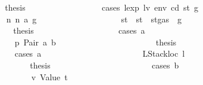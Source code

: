 \begin{isabellebody}
\ \ \ \ \ \ \ \ \ \ \ \ \ \ \ \ \isamarkupfalse%
\ \isamarkupfalse%
\ {\isacharquery}{\kern0pt}thesis\isanewline
\ \ \ \ \ \ \ \ \ \ \ \ \ \ \ \ \isamarkupfalse%
\ {\isacharparenleft}{\kern0pt}cases\ {\isachardoublequoteopen}lexp\ lv\ env\ cd\ st{\isacharprime}{\kern0pt}{\isacharprime}{\kern0pt}\ g{\isacharprime}{\kern0pt}{\isachardoublequoteclose}{\isacharparenright}{\kern0pt}\isanewline
\ \ \ \ \ \ \ \ \ \ \ \ \ \ \ \ \ \ \isamarkupfalse%
\ n{}{\isacharcolon}{\kern0pt}\ {\isacharparenleft}{\kern0pt}n\ a\ g{\isacharprime}{\kern0pt}{\isacharprime}{\kern0pt}{\isacharparenright}{\kern0pt}\isanewline
\ \ \ \ \ \ \ \ \ \ \ \ \ \ \ \ \ \ \isamarkupfalse%
\ st{\isacharprime}{\kern0pt}{\isacharprime}{\kern0pt}{\isacharprime}{\kern0pt}\ \ {\isachardoublequoteopen}st{\isacharprime}{\kern0pt}{\isacharprime}{\kern0pt}{\isacharprime}{\kern0pt}\ {\isacharequal}{\kern0pt}\ st{\isacharprime}{\kern0pt}{\isacharprime}{\kern0pt}{\isasymlparr}gas\ {\isacharcolon}{\kern0pt}{\isacharequal}{\kern0pt}\ g{\isacharprime}{\kern0pt}{\isacharprime}{\kern0pt}{\isasymrparr}{\isachardoublequoteclose}\isanewline
\ \ \ \ \ \ \ \ \ \ \ \ \ \ \ \ \ \ \isamarkupfalse%
\ \isamarkupfalse%
\ {\isacharquery}{\kern0pt}thesis\isanewline
\ \ \ \ \ \ \ \ \ \ \ \ \ \ \ \ \ \ \isamarkupfalse%
\ {\isacharparenleft}{\kern0pt}cases\ a{\isacharparenright}{\kern0pt}\isanewline
\ \ \ \ \ \ \ \ \ \ \ \ \ \ \ \ \ \ \ \ \isamarkupfalse%
\ p{}{\isacharcolon}{\kern0pt}\ {\isacharparenleft}{\kern0pt}Pair\ a\ b{\isacharparenright}{\kern0pt}\isanewline
\ \ \ \ \ \ \ \ \ \ \ \ \ \ \ \ \ \ \ \ \isamarkupfalse%
\ \isamarkupfalse%
\ {\isacharquery}{\kern0pt}thesis\isanewline
\ \ \ \ \ \ \ \ \ \ \ \ \ \ \ \ \ \ \ \ \isamarkupfalse%
\ {\isacharparenleft}{\kern0pt}cases\ a{\isacharparenright}{\kern0pt}\isanewline
\ \ \ \ \ \ \ \ \ \ \ \ \ \ \ \ \ \ \ \ \ \ \isamarkupfalse%
\ {\isacharparenleft}{\kern0pt}LStackloc\ l{\isacharparenright}{\kern0pt}\isanewline
\ \ \ \ \ \ \ \ \ \ \ \ \ \ \ \ \ \ \ \ \ \ \isamarkupfalse%
\ \isamarkupfalse%
\ {\isacharquery}{\kern0pt}thesis\isanewline
\ \ \ \ \ \ \ \ \ \ \ \ \ \ \ \ \ \ \ \ \ \ \isamarkupfalse%
\ {\isacharparenleft}{\kern0pt}cases\ b{\isacharparenright}{\kern0pt}\isanewline
\ \ \ \ \ \ \ \ \ \ \ \ \ \ \ \ \ \ \ \ \ \ \ \ \isamarkupfalse%
\ v{}{\isacharcolon}{\kern0pt}\ {\isacharparenleft}{\kern0pt}Value\ t{\isacharprime}{\kern0pt}{\isacharparenright}{\kern0pt}\isanewline

\end{isabellebody}
